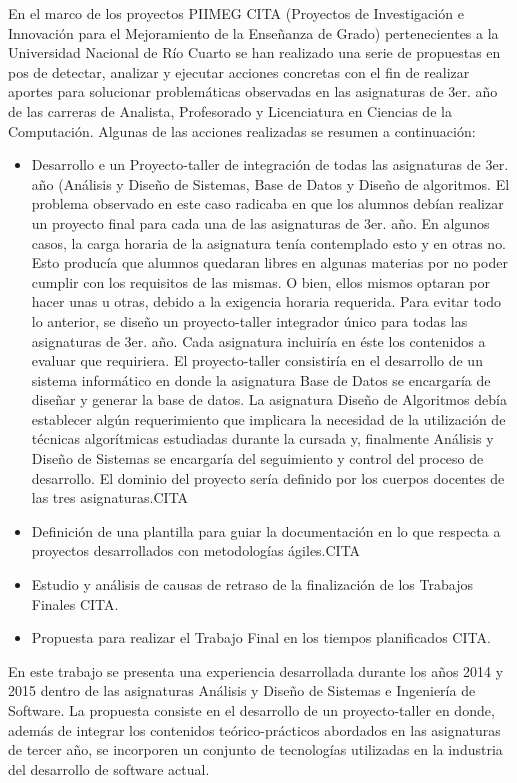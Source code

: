  
En el marco de los proyectos PIIMEG CITA (Proyectos de Investigación e Innovación para el Mejoramiento de la Enseñanza de Grado) pertenecientes a la Universidad
 Nacional de Río Cuarto se han realizado una serie de propuestas en pos de detectar, analizar y ejecutar acciones concretas con el 
 fin de realizar aportes para solucionar problemáticas observadas en las asignaturas de 3er. año de las carreras de Analista, Profesorado y 
 Licenciatura en Ciencias de la Computación. Algunas de las acciones realizadas se resumen a continuación:
 \begin{itemize}
 \item Desarrollo e un Proyecto-taller de integración de todas las asignaturas de 3er. año (Análisis y Diseño de Sistemas, Base de Datos y 
  Diseño de algoritmos. El problema observado en este caso radicaba en que los alumnos debían realizar un proyecto final  para cada una de las asignaturas
 de 3er. año. En algunos casos, la carga horaria de la asignatura tenía contemplado esto y en otras no. Esto producía que  alumnos
quedaran libres en algunas materias por no poder cumplir con los requisitos de las mismas. O bien, ellos mismos optaran por hacer unas u otras, debido a la exigencia horaria requerida.  
Para evitar todo lo anterior, se diseño un proyecto-taller integrador único para todas las asignaturas de 3er. año. Cada asignatura incluiría en éste 
los contenidos a evaluar que requiriera. El proyecto-taller consistiría en el desarrollo de un
 sistema informático en donde la asignatura Base de Datos se encargaría de diseñar y generar la base de datos.
 La asignatura Diseño de Algoritmos 
 debía establecer 
 algún requerimiento que implicara la necesidad de la utilización de técnicas algorítmicas estudiadas durante la cursada y, finalmente  Análisis y Diseño de Sistemas
 se encargaría del seguimiento y control del proceso de desarrollo. El dominio del proyecto sería definido por los cuerpos docentes de las tres asignaturas.CITA
 \item Definición de una plantilla para guiar la documentación en lo que respecta a proyectos desarrollados con metodologías ágiles.CITA 
\item Estudio y análisis de causas de retraso de la finalización de los Trabajos Finales CITA. 
\item Propuesta para realizar el Trabajo Final en los tiempos planificados CITA.
\end{itemize}

En este trabajo se presenta una experiencia desarrollada durante los años 2014 y 2015 dentro de las asignaturas Análisis y Diseño de Sistemas e Ingeniería de Software. 
La propuesta consiste en el desarrollo de un proyecto-taller en donde, además de integrar los contenidos teórico-prácticos abordados en las 
asignaturas de tercer año, se incorporen un conjunto de tecnologías utilizadas en la industria del desarrollo de software actual. \\



